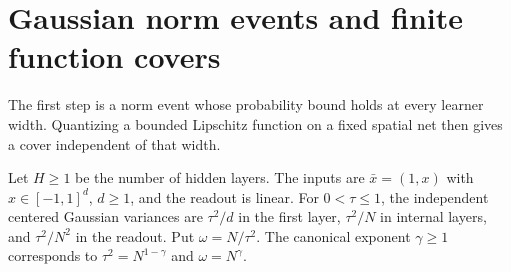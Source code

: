\section{Gaussian norm events and finite function covers}
\label{sec:lipschitz-output-cover}

The first step is a norm event whose probability bound holds at every
learner width. Quantizing a bounded Lipschitz function on a fixed spatial
net then gives a cover independent of that width.

Let $H\geq1$ be the number of hidden layers.  The inputs are
$\bar x=(1,x)$ with $x\in[-1,1]^d$, $d\geq1$, and the readout is
linear.  For $0<\tau\leq1$, the independent centered Gaussian
variances are $\tau^2/d$ in the first layer, $\tau^2/N$ in internal
layers, and $\tau^2/N^2$ in the readout.  Put $\omega=N/\tau^2$.
The canonical exponent $\gamma\geq1$ corresponds to
$\tau^2=N^{1-\gamma}$ and $\omega=N^\gamma$.

